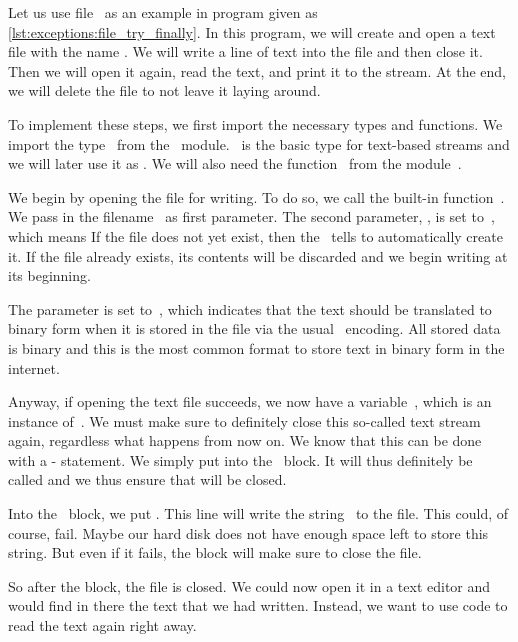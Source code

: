 Let us use file~ as an example in program  given as \cref{lst:exceptions:file_try_finally}.
In this program, we will create and open a text file with the name .
We will write a line of text into the file and then close it.
Then we will open it again, read the text, and print it to the  stream.
At the end, we will delete the file to not leave it laying around.

To implement these steps, we first import the necessary types and functions.
We import the type~ from the ~module.
~is the basic type for text-based  streams and we will later use it as .
We will also need the function~ from the module~.

We begin by opening the file  for writing.
To do so, we call the built-in function~.
We pass in the filename~ as first parameter.
The second parameter, , is set to~, which means 
If the file does not yet exist, then the~ tells  to automatically create it.
If the file already exists, its contents will be discarded and we begin writing at its beginning.

The parameter  is set to~, which indicates that the text should be translated to binary form when it is stored in the file via the usual ~encoding.
All stored data is binary and this is the most common format to store text in binary form in the internet.

Anyway, if opening the text file succeeds, we now have a variable~, which is an instance of~.
We must make sure to definitely close this so-called text stream again, regardless what happens from now on.
We know that this can be done with a - statement.
We simply put  into the ~block.
It will thus definitely be called and we thus ensure that  will be closed.%
%
\begin{sloppypar}%
Into the ~block, we put .
This line will write the string~ to the file.
This could, of course, fail.
Maybe our hard disk does not have enough space left to store this string.
But even if it fails, the  block will make sure to close the file.%
\end{sloppypar}%
%
So after the block, the file is closed.
We could now open it in a text editor and would find in there the text that we had written.
Instead, we want to use code to read the text again right away.

